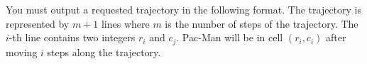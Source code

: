 You must output a requested trajectory in the following format.
The trajectory is represented by $m+1$ lines where $m$ is the number of
steps of the trajectory.
The $i$-th line contains two integers $r_i$ and $c_j$.
Pac-Man will be in cell $(r_i,c_i)$ after moving $i$ steps along the trajectory.
